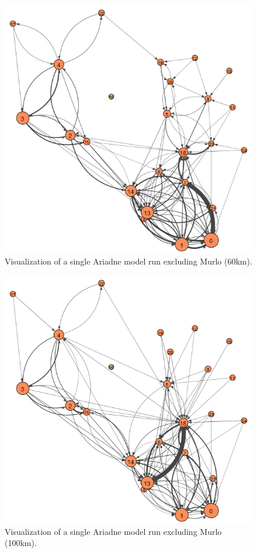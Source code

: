 \documentclass[12pt,a4paper]{thesis}
\begin{document}
\begin{figure}[H]
\centering
\includegraphics[width=0.9\linewidth]{./AfterViz/ariadne60}
\caption{Visualization of a single Ariadne model run excluding Murlo (60km).}
\label{fig:ariadneA60}
\end{figure}


\begin{figure}[H]
\centering
\includegraphics[width=0.9\linewidth]{./AfterViz/ariadne100}
\caption{Visualization of a single Ariadne model run excluding Murlo (100km).}
\label{fig:ariadneA100}
\end{figure}
\end{document}
